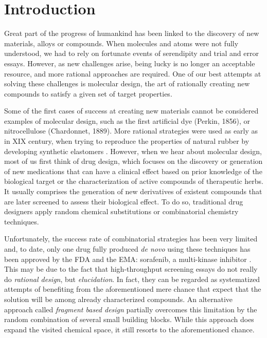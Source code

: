 \chapter{Introduction}%

Great part of the progress of humankind has been linked to the discovery of new materials, alloys or compounds. When molecules and atoms were not fully understood, we had to rely on fortunate events of serendipity and trial and error essays. However, as new challenges arise, being lucky is no longer an acceptable resource, and more rational approaches are required. One of our best attempts at solving these challenges is molecular design, the art of rationally creating new compounds to satisfy a given set of target properties.

Some of the first cases of success at creating new materials cannot be considered examples of molecular design, such as the first artificial dye (Perkin, 1856), or nitrocellulose (Chardonnet, 1889). More rational strategies were used as early as in XIX century, when trying to reproduce the properties of natural rubber by developing synthetic elastomers . However, when we hear about molecular design, most of us first think of drug design, which focuses on the discovery or generation of new medications that can have a clinical effect based on prior knowledge of the biological target or the characterization of active compounds of therapeutic herbs. It usually comprises the generation of new derivatives of existent compounds that are later screened to assess their biological effect. To do so, traditional drug designers apply random chemical substitutions or combinatorial chemistry techniques.

Unfortunately, the success rate of combinatorial strategies has been very limited and, to date, only one drug fully produced \emph{de novo} using these techniques has been approved by the FDA and the EMA: sorafenib, a multi-kinase inhibitor . This may be due to the fact that high-throughput screening essays do not really do \emph{rational design}, but \emph{elucidation}. In fact, they can be regarded as systematized attempts of benefiting from the aforementioned mere chance that expect that the solution will be among already characterized compounds. An alternative approach called \emph{fragment based design} partially overcomes this limitation by the random combination of several small building blocks. While this approach does expand the visited chemical space, it still resorts to the aforementioned chance.

